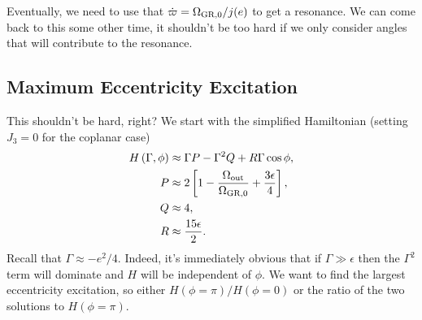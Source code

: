 \documentclass[10pt,
        usenames, %
        dvipsnames %
    ]{article}
\newcommand*{\p}[1]{\left(#1\right)}
\newcommand*{\s}[1]{\left[#1\right]}
\begin{document}
Eventually, we need to use that $\dot{\varpi} = \Omega_{\rm GR,0} / j(e)$ to get
a resonance. We can come back to this some other time, it shouldn't be too hard
if we only consider angles that will contribute to the resonance.

\subsection{Maximum Eccentricity Excitation}

This shouldn't be hard, right? We start with the simplified Hamiltonian (setting
$J_3 = 0$ for the coplanar case)
\begin{align}
    H\p{\Gamma, \phi} &\approx \Gamma P - \Gamma^2 Q + R\Gamma \cos \phi,\\
    P &\approx 2\s{1 - \frac{\Omega_{\rm out}}{\Omega_{\rm GR, 0}}
        + \frac{3\epsilon}{4}},\\
    Q &\approx 4,\\
    R &\approx \frac{15\epsilon}{2}.
\end{align}
Recall that $\Gamma \approx -e^2/4$. Indeed, it's immediately obvious that if
$\Gamma \gg \epsilon$ then the $\Gamma^2$ term will dominate and $H$ will be
independent of $\phi$. We want to find the largest eccentricity excitation, so
either $H(\phi = \pi) / H(\phi = 0)$ or the ratio of the two solutions to
$H\p{\phi = \pi}$.
\end{document}
